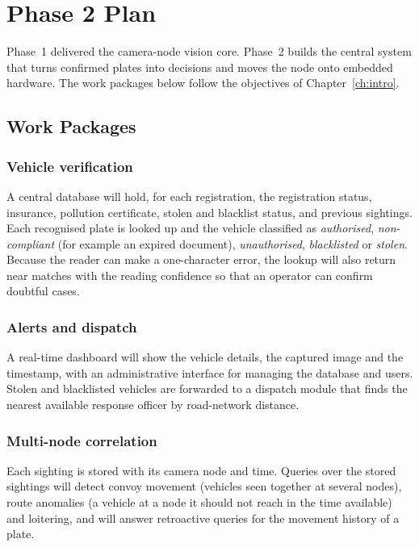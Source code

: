 \chapter{Phase 2 Plan}
\label{ch:phase2}

Phase~1 delivered the camera-node vision core. Phase~2 builds the central
system that turns confirmed plates into decisions and moves the node onto
embedded hardware. The work packages below follow the objectives of
Chapter~\ref{ch:intro}.

\section{Work Packages}

\subsection{Vehicle verification}

A central database will hold, for each registration, the registration status,
insurance, pollution certificate, stolen and blacklist status, and previous
sightings. Each recognised plate is looked up and the vehicle classified as
\emph{authorised}, \emph{non-compliant} (for example an expired document),
\emph{unauthorised}, \emph{blacklisted} or \emph{stolen}. Because the reader can
make a one-character error, the lookup will also return near matches with the
reading confidence so that an operator can confirm doubtful cases.

\subsection{Alerts and dispatch}

A real-time dashboard will show the vehicle details, the captured image and the
timestamp, with an administrative interface for managing the database and
users. Stolen and blacklisted vehicles are forwarded to a dispatch module that
finds the nearest available response officer by road-network distance.

\subsection{Multi-node correlation}

Each sighting is stored with its camera node and time. Queries over the stored
sightings will detect convoy movement (vehicles seen together at several
nodes), route anomalies (a vehicle at a node it should not reach in the time
available) and loitering, and will answer retroactive queries for the movement
history of a plate.

